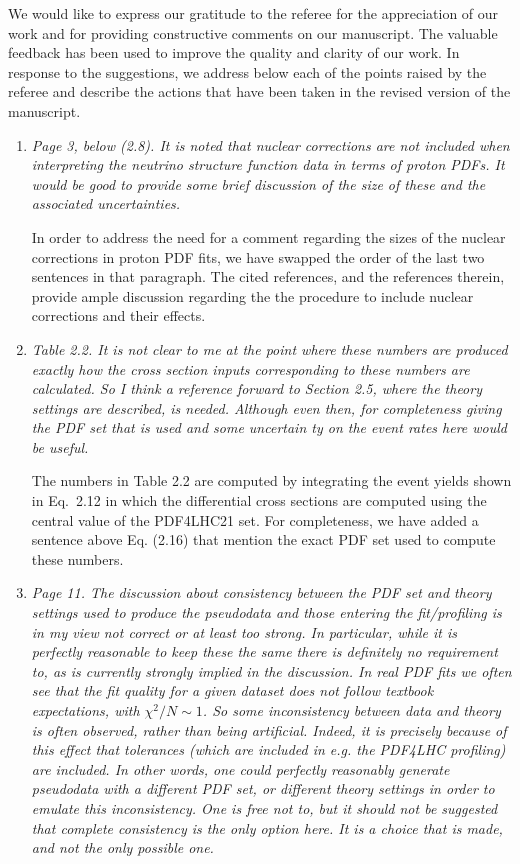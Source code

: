 \documentclass[11pt,a4paper]{article}
\begin{document}
	
\noindent
We would like to express our gratitude to the referee for the appreciation
of our work and for providing constructive
comments on our manuscript. The valuable feedback has been used to
improve the quality and clarity of our work.
%
In response to the suggestions, we address below each of the points raised by 
the referee and describe the actions that have been taken
in the revised version of the manuscript.

\noindent

\begin{enumerate}
	\item {\it Page 3, below (2.8). It is noted that nuclear corrections are not included when 
		interpreting the neutrino structure function data in terms of proton PDFs. It would be good
		to provide some brief discussion of the size of these and the associated uncertainties.
	}
	
	In order to address the need for a comment regarding the sizes of the nuclear corrections
	in proton PDF fits, we have swapped the order of the last two sentences in that paragraph.
	The cited references, and the references therein, provide ample discussion regarding the
	the procedure to include nuclear corrections and their effects.
	
	\item {\it Table 2.2. It is not clear to me at the point where these numbers are produced exactly
		how the cross section inputs corresponding to these numbers are calculated. So I
		think a reference forward to Section 2.5, where the theory settings are described, is
		needed. Although even then, for completeness giving the PDF set that is used and
		some uncertain
		ty on the event rates here would be useful.
	}
	
	The numbers in Table 2.2 are computed by integrating the event yields shown in Eq.~2.12 in
	which the differential cross sections are computed using the central value of the PDF4LHC21
	set. For completeness, we have added a sentence above Eq. (2.16) that mention the exact
	PDF set used to compute these numbers.
	
	\item {\it Page 11. The discussion about consistency between the PDF set and theory settings
		used to produce the pseudodata and those entering the fit/profiling is in my view not
		correct or at least too strong. In particular, while it is perfectly reasonable to keep
		these the same there is definitely no requirement to, as is currently strongly implied in
		the discussion. In real PDF fits we often see that the fit quality for a given dataset does
		not follow textbook expectations, with $\chi^2/N \sim 1$. So some inconsistency between data
		and theory is often observed, rather than being artificial. Indeed, it is precisely because
		of this effect that tolerances (which are included in e.g. the PDF4LHC profiling) are
		included. In other words, one could perfectly reasonably generate pseudodata with a
		different PDF set, or different theory settings in order to emulate this inconsistency.
		One is free not to, but it should not be suggested that complete consistency is the only
		option here. It is a choice that is made, and not the only possible one.
	}
	

\end{enumerate}
\end{document}
